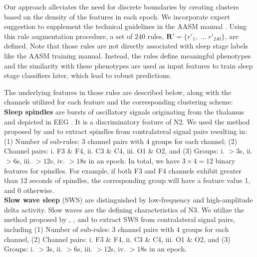 \documentclass[pmlr]{jmlr}
\begin{document}
Our approach alleviates the need for discrete boundaries by creating clusters based on the density of the features in each epoch. We incorporate expert suggestion to supplement the technical guidelines in the AASM manual \citep{berry2012aasm}. Using this rule augmentation procedure, a set of $240$ rules, $\bm{R}'=\{r'_1, \; \dots \; r'_{240}\}$, are defined. Note that those rules are not directly associated with sleep stage labels like the AASM training manual. Instead, the rules define meaningful phenotypes and the similarity with these phenotypes are used as input features to train sleep stage classifiers later, which lead to robust predictions.


The underlying features in those rules are described below, along with the channels utilized for each feature and the corresponding clustering scheme:\\

\noindent\textbf{Sleep spindles} are bursts of oscillatory signals originating from the thalamus and depicted in EEG \citep{spindle}. It is a discriminatory feature of N2. We used the method proposed by \citep{spindle_algo} and \citep{yasa} to extract spindles from contralateral signal pairs resulting in: 
(1) Number of sub-rules: 3 channel pairs with 4 groups for each channel; (2) Channel pairs: i. F3 \& F4, ii. C3 \& C4, iii. O1 \& O2, and (3) Groups: i. $>3$s, ii. $>6$s, iii. $>12$s, iv. $>18$s in an epoch. In total, we have $3 \times 4 = 12$ binary features for spindles. For example, if both F3 and F4 channels exhibit greater than 12 seconds of spindles, the corresponding group will have a feature value 1, and 0 otherwise. 
\\

\noindent\textbf{Slow wave sleep} (SWS) are distinguished by low-frequency and high-amplitude delta activity. Slow waves are the defining characteristics of N3. We utilize the method proposed by \citep{sws_algo1}, \citep{sws_algo2}, and \citep{yasa} to extract SWS from contralateral signal pairs, including (1) Number of sub-rules: 3 channel pairs with 4 groups for each channel, (2) Channel pairs: i. F3 \& F4, ii. C3 \& C4, iii. O1 \& O2, and (3) Groups: i.  $>3$s, ii. $>6$s, iii. $>12$s, iv. $>18$s in an epoch.\\
\end{document}
